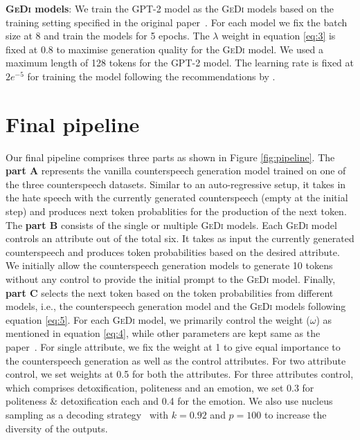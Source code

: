 \noindent\textbf{\textsc{GeDi} models}: We train the GPT-2 model as the \textsc{GeDi} models based on the training setting specified in the original paper~\cite{krause2020gedi}. For each model we fix the batch size at 8  and train the models for 5 epochs. The $\lambda$ weight in equation \ref{eq:3} is fixed at 0.8 to maximise generation quality for the \textsc{GeDi} model. We used a maximum length of 128 tokens for the GPT-2 model.  The learning rate is fixed at $2e^{-5}$ for training the model following the recommendations by \citet{krause2020gedi}. 

\section{Final pipeline}
Our final pipeline comprises three parts as shown in Figure \ref{fig:pipeline}. The \textbf{part A} represents the vanilla counterspeech generation model trained on one of the three counterspeech datasets. Similar to an auto-regressive setup, it takes in the hate speech with the currently generated counterspeech (empty at the initial step) and produces next token probablities for the production of the next token. The \textbf{part B} consists of the single or multiple \textsc{GeDi} models. Each \textsc{GeDi} model controls an attribute out of the total six. It takes as input the currently generated counterspeech and produces token probabilities based on the desired attribute. We initially allow the counterspeech generation models to generate 10 tokens without any control to provide the initial prompt to the \textsc{GeDi} model. Finally, \textbf{part C} selects the next token based on the token probabilities from different models, i.e., the counterspeech generation model and the \textsc{GeDi} models following equation \ref{eq:5}. For each \textsc{GeDi} model, we primarily control the weight ($\omega$) as mentioned in equation \ref{eq:4}, while other parameters are kept same as the paper~\cite{krause2020gedi}. For single attribute, we fix the weight at 1 to give equal importance to the counterspeech generation as well as the control attributes. For two attribute control, we set weights at 0.5 for both the attributes. For three attributes control, which comprises detoxification, politeness and an emotion, we set 0.3 for politeness \& detoxification each and 0.4 for the emotion. We also use nucleus sampling as a decoding strategy~\cite{holtzman2019curious} with $k=0.92$ and $p=100$ to increase the diversity of the outputs.
 



